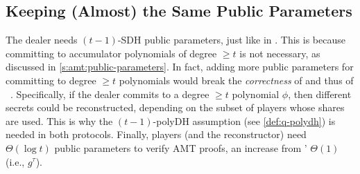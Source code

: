 \subsection{Keeping (Almost) the Same Public Parameters}
\label{s:scalable-vss:public-params}
The \ourvss dealer needs $(t-1)$-SDH public parameters, just like in \evss.
This is because committing to accumulator polynomials of degree $\ge t$ is not necessary, as discussed in \cref{s:amt:public-parameters}.
In fact, adding more public parameters for committing to degree $\ge t$ polynomials would break the \textit{correctness} of \evss and thus of \ourvss~\cite{KZG10a}.
Specifically, if the dealer commits to a degree $\ge t$ polynomial $\phi$, then different secrets could be reconstructed, depending on the subset of players whose shares are used.
This is why the $(t-1)$-polyDH assumption (see \cref{def:q-polydh}) is needed in both protocols.
Finally, \ourvss players (and the reconstructor) need $\Theta(\log{t})$ public parameters to verify AMT proofs, an increase from \evss' $\Theta(1)$ (i.e., $g^\tau$).
